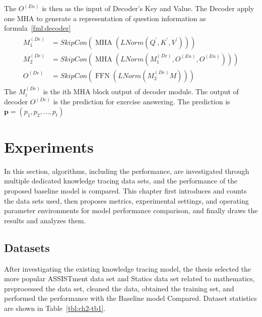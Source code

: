 The \(O^{(En)}\) is then as the input of Decoder's Key and Value. The Decoder apply one MHA to generate a representation of question information as formula~\ref{fml:decoder}
\begin{align}\label{fml:decoder}
    \begin{split}
        M^{(De)}_1 & =SkipCon(\operatorname{MHA}(LNorm(Q^\prime,K^\prime,V^\prime)))    \\
        M^{(De)}_2 & =SkipCon(\operatorname{MHA}(LNorm(M^{(De)}_1 ,O^{(En)},O^{(En)}))) \\
        O^{(De)}   & =SkipCon(\operatorname{FFN}(LNorm(M^{(De)}_2M)))
    \end{split}
\end{align}
The \(M^{(De)}_i\) is the ith MHA block output of decoder module. The output of decoder \(O^{(De)}\) is the prediction for exercise answering. The prediction is \(\mathbf{p}=(p_1,p_2,\ldots,p_t)\)

\section{Experiments}
In this section, algorithms, including the performance, are investigated through multiple dedicated knowledge tracing data sets, and the performance of the proposed baseline model is compared. This chapter first introduces and counts the data sets used, then proposes metrics, experimental settings, and operating parameter environments for model performance comparison, and finally draws the results and analyzes them.


\subsection{Datasets}
After investigating the existing knowledge tracing model, the thesis selected the more popular ASSISTment data set and Statics data set related to mathematics, preprocessed the data set, cleaned the data, obtained the training set, and performed the performance with the Baseline model Compared. Dataset statistics are shown in Table~\ref{tbl:ch2-tb1}.

